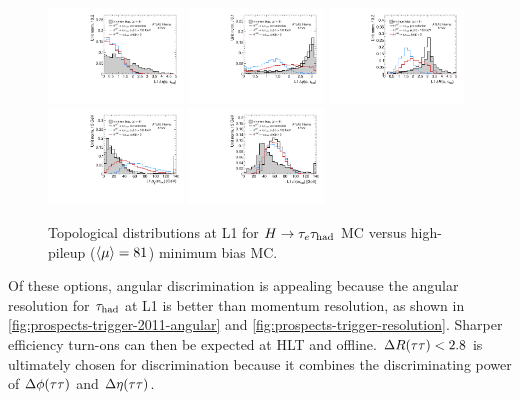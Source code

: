 \begin{figure}[!htpb]
  \centering
  \includegraphics[width=0.32\textwidth]{figures/l1topo/taulep-deta}
  \includegraphics[width=0.32\textwidth]{figures/l1topo/taulep-dphi}
  \includegraphics[width=0.32\textwidth]{figures/l1topo/taulep-dR}
  \includegraphics[width=0.32\textwidth]{figures/l1topo/ditau-pt}
  \includegraphics[width=0.32\textwidth]{figures/l1topo/ditau-m}
  \caption{Topological distributions at L1 for $H\rightarrow\tau_e \tau_\text{had}$ MC versus high-pileup ($\langle\mu\rangle=81$) minimum bias MC.}
  \label{fig:prospects-trigger-l1topo}
\end{figure}

Of these options, angular discrimination is appealing because the angular resolution for $\tau_\text{had}$ at L1 is better than momentum resolution, as shown in \cref{fig:prospects-trigger-2011-angular} and \cref{fig:prospects-trigger-resolution}. Sharper efficiency turn-ons can then be expected at HLT and offline. $\Delta R(\tau\tau) < 2.8$ is ultimately chosen for discrimination because it combines the discriminating power of $\Delta\phi(\tau\tau)$ and $\Delta\eta(\tautau)$.

